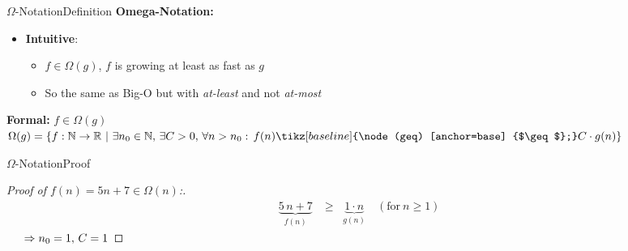 \begin{frame}{$\Omega$-Notation}{Definition}
  \textbf{Omega-Notation:}
  \begin{itemize}
    \item
      \textbf{Intuitive}:
      \begin{itemize}
        \item
          $f \in \Omega(g)$, $f$ is growing at least as fast as $g$
        \item
          So the same as Big-O but with \textit{at-least} and not
          \textit{at-most}
      \end{itemize}
  \end{itemize}
  \begin{block}{\textbf{Formal:} $f \in \Omega(g)$}
    \begin{math}
      \Omega(g) = \lbrace f: \mathbb{N} \to \mathbb{R} ~ | ~
        \exists n_0 \in \mathbb{N}, \, \exists C > 0, \,  \forall n > n_0:\,
        f(n) \tikz[baseline] {\node (geq) [anchor=base] {$\geq$};}
        C \cdot g(n)\rbrace
    \end{math}
  \end{block}
  \begin{center}
  \end{center}
\end{frame}


\begin{frame}{$\Omega$-Notation}{Proof}
  \label{slide:prooftwo}
  \begin{proof}[Proof of $f(n) = 5n + 7 \in \Omega(n)$:]
    \begin{eqnarray*}
      &\underbrace{5 \, n + 7}_{f(n)} &\geq \;\; \underbrace{1 \cdot n}_{g(n)}
      \hspace{1em} (\text{for} ~ n \geq 1)
    \end{eqnarray*}
    $\hspace{1.5em} \Rightarrow n_0 = 1, \, C = 1$ \qedhere
  \end{proof}
\end{frame}

